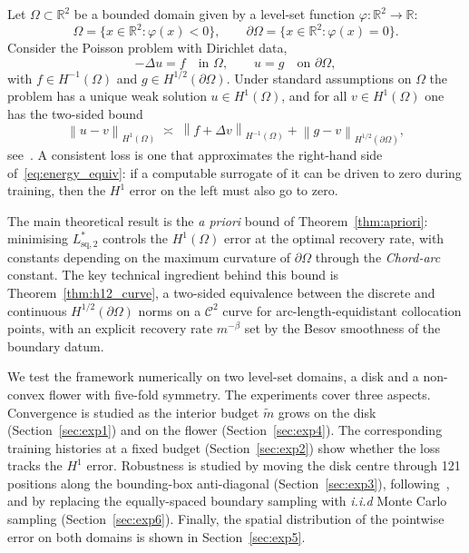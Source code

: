 \documentclass[11pt]{article}
\newcommand{\Omg}{\Omega}
\newcommand{\bOmg}{\partial\Omega}
\newcommand{\C}{\mathcal{C}}
\newcommand{\Hone}{H^1(\Omega)}
\newcommand{\Hmone}{H^{-1}(\Omega)}
\newcommand{\Honehalf}{H^{1/2}(\partial\Omega)}
\newcommand{\norm}[1]{\left\|#1\right\|}
\newcommand{\mtil}{\widetilde{m}}
\newcommand{\R}{\mathbb{R}}
\begin{document}
Let $\Omg \subset \R^2$ be a bounded domain given by a level-set
function $\varphi\colon \R^2 \to \R$:
\[
  \Omg = \bigl\{x \in \R^2 : \varphi(x) < 0\bigr\},
  \qquad
  \bOmg = \bigl\{x \in \R^2 : \varphi(x) = 0\bigr\}.
\]
Consider the Poisson problem with Dirichlet data,
\begin{equation}\label{eq:poisson}
  -\Delta u = f \quad \text{in } \Omg,
  \qquad
  u = g \quad \text{on } \bOmg,
\end{equation}
with $f \in \Hmone$ and $g \in \Honehalf$. Under standard
assumptions on $\Omg$ the problem has a unique weak solution
$u \in \Hone$, and for all $v \in \Hone$ one
has the two-sided bound
\begin{equation}\label{eq:energy_equiv}
  \norm{u - v}_{\Hone}
  \;\asymp\;
  \norm{f + \Delta v}_{\Hmone}
  + \norm{g - v}_{\Honehalf},
\end{equation}
see~\cite{bonito2025}. A consistent loss is one that approximates
the right-hand side of~\eqref{eq:energy_equiv}: if a computable
surrogate of it can be driven to zero during training, then the
$H^1$ error on the left must also go to zero.





The main theoretical result is the \emph{a priori} bound of
Theorem~\ref{thm:apriori}: minimising $L^*_{\mathrm{sq},2}$
controls the $H^1(\Omg)$ error at the optimal recovery rate, with
constants depending on the maximum curvature of $\bOmg$ through
the \textit{Chord-arc} constant. The key technical ingredient behind this
bound is Theorem~\ref{thm:h12_curve}, a two-sided equivalence
between the discrete and continuous $H^{1/2}(\bOmg)$ norms on a
$\C^2$ curve for arc-length-equidistant collocation points, with an
explicit recovery rate $m^{-\beta}$ set by the Besov smoothness of
the boundary datum.

We test the framework numerically on two level-set domains, a disk
and a non-convex flower with five-fold symmetry. The experiments
cover three aspects. Convergence is studied as the interior budget
$\mtil$ grows on the disk (Section~\ref{sec:exp1}) and on the
flower (Section~\ref{sec:exp4}). The corresponding training
histories at a fixed budget (Section~\ref{sec:exp2}) show whether
the loss tracks the $H^1$ error. Robustness is studied by moving
the disk centre through 121 positions along the bounding-box
anti-diagonal (Section~\ref{sec:exp3}), following~\cite{li2026},
and by replacing the equally-spaced boundary sampling with
{\em i.i.d} Monte Carlo sampling (Section~\ref{sec:exp6}). Finally,
the spatial distribution of the pointwise error on both domains is
shown in Section~\ref{sec:exp5}.
\end{document}
